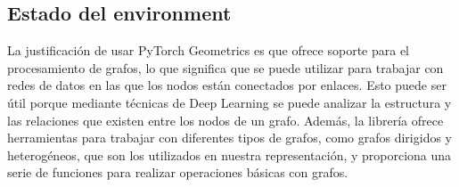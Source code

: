 \subsection{Estado del environment}
La justificación de usar PyTorch Geometrics es que ofrece soporte para el procesamiento de grafos,
lo que significa que se puede utilizar para trabajar con redes de datos en las que los nodos están
conectados por enlaces. Esto puede ser útil porque mediante técnicas de Deep Learning se puede analizar
la estructura y las relaciones que existen entre los nodos de un grafo. Además, la librería ofrece herramientas
para trabajar con diferentes tipos de grafos, como grafos dirigidos y heterogéneos, que son los utilizados en
nuestra representación, y proporciona una serie de funciones para realizar operaciones básicas con grafos.

\pagebreak
